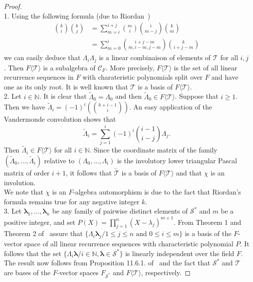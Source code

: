 \documentclass[12pt]{amsart}
\theoremstyle{definition}
\numberwithin{equation}{section}
\numberwithin{equation}{section}
\begin{document}
\begin{proof}~
\\1. Using the following formula (due to Riordan~\cite{Riord})
\begin{align*}
\binom{k}{i}\binom{k}{j}&=\sum_{m=i}^{i+j} \binom{m}{i}\binom{i}{m-j}\binom{k}{m}\\
&=\sum_{m=0}^{i} \binom{i+j-m}{m,i-m,j-m}\binom{k}{i+j-m}
\end{align*}
we can easily deduce that $\Lambda_{i}\Lambda_{j}$ is a linear combinaison of elements of $\mathcal{T}$ for all $i,j$. Then $F\langle \mathcal{T} \rangle$ is a subalgebra of $\mathcal{C}_{F}$. More precisely, $F\langle \mathcal{T} \rangle$ is the set of all linear recurrence sequences in $F$ with charateristic polynomials split over $F$ and have one as its only root. It is well known that $\mathcal{T}$ is a basis of $F\langle \mathcal{T} \rangle$.
\\2. Let $i\in \mathbb{N}$. It is clear that $\widetilde{\Lambda}_{0}=\Lambda_{0}$ and then $\widetilde{\Lambda}_{0}\in F\langle \mathcal{T} \rangle$. Suppose that $i\geqslant 1$. Then we have $\widetilde{\Lambda}_{i}=(-1)^{i}(\binom{k+i-1}{i})$. An easy application of the Vandermonde convolution shows that
$$\widetilde{\Lambda}_{i}=\sum_{j=1}^{i}(-1)^{i}\binom{i-1}{i-j}\Lambda_{j}.$$
Then $\widetilde{\Lambda}_{i}\in F\langle \mathcal{T} \rangle$ for all $i\in \mathbb{N}$. Since the coordinate matrix of the family $(\widetilde{\Lambda}_{0},\ldots,\widetilde{\Lambda}_{i})$ relative to $(\Lambda_{0},\ldots,\Lambda_{i})$ is the involutory lower triangular Pascal matrix of order $i+1$, it follows that $\widetilde{\mathcal{T}}$ is a basis of $F\langle \mathcal{T} \rangle$ and that $\chi$ is an involution.
\\We note that $\chi$ is an $F$-algebra automorphism is due to the fact that Riordan's formula remains true for any negative integer $k$.
\\3.
Let $\pmb{\lambda}_{1},\ldots,\pmb{\lambda}_{n}$ be any family of pairwise distinct elements of $\mathcal{S}^{\ast}$ and $m$ be a positive integer, and set $P(X)=\displaystyle\prod_{j=1}^{n}(X-\lambda_{j})^{m+1}$. From Theorem 1 and Theorem 2 of~\cite{Fill} assure that $\{\Lambda_{i}\pmb{\lambda}_{j}/1\leqslant j\leqslant n \,\,\text{and}\,\, 0\leqslant i\leqslant m\}$ is a basis of the $F$-vector space of all linear recurrence sequences with characteristic polynomial $P$. It follows that the set $\{\Lambda_{i}\pmb{\lambda}/i\in \mathbb{N}, \pmb{\lambda}\in \mathcal{S}^{\ast}\}$ is linearly independent over the field $F$. The result now follows from Proposition 11.6.1. of~\cite{Cohn} and the fact that $\mathcal{S}^{\ast}$ and $\mathcal{T}$ are bases of the $F$-vector spaces $F_{\mathcal{S}^{\ast}}$ and $F\langle \mathcal{T} \rangle$, respectively.

\end{proof}
\end{document}
